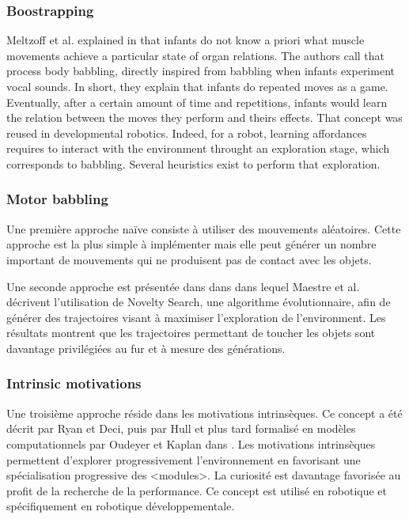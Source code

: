 \documentclass{llncs}
\begin{document}
\subsubsection{Boostrapping}
Meltzoff et al. explained in \cite{EDP:EDP157} that infants do not know a priori what muscle movements achieve a particular state of organ relations. The authors call that process body babbling, directly inspired from babbling when infants experiment vocal sounds. In short, they explain that infants do repeated moves as a game. Eventually, after a certain amount of time and repetitions, infants would learn the relation between the moves they perform and theirs effects. That concept was reused in developmental robotics. Indeed, for a robot, learning affordances requires to interact with the environment throught an exploration stage, which corresponds to babbling. Several heuristics exist to perform that exploration.




\subsubsection{Motor babbling}
Une première approche naïve consiste à utiliser des mouvements aléatoires. Cette approche est la plus simple à implémenter mais elle peut générer un nombre important de mouvements qui ne produisent pas de contact avec les objets.

Une seconde approche est présentée dans dans \cite{Maestre2015} dans lequel Maestre et al. décrivent l'utilisation de Novelty Search, une algorithme évolutionnaire, afin de générer des trajectoires visant à maximiser l'exploration de l'environment. Les résultats montrent que les trajectoires permettant de toucher les objets sont davantage privilégiées au fur et à mesure des générations.




\subsubsection{Intrinsic motivations}
Une troisième approche réside dans les motivations intrinsèques. Ce concept a été décrit par Ryan et Deci, puis par Hull et plus tard formalisé en modèles computationnels par Oudeyer et Kaplan dans \cite{10.3389/neuro.12.006.2007}. Les motivations intrinsèques permettent d'explorer progressivement l'environnement en favorisant une spécialisation progressive des <modules>. La curiosité est davantage favorisée au profit de la recherche de la performance. Ce concept est utilisé en robotique et spécifiquement en robotique développementale.
\end{document}
